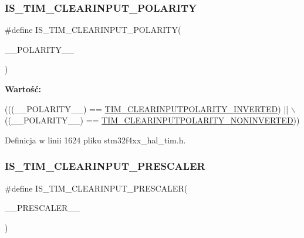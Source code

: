 \subsubsection{\texorpdfstring{I\+S\+\_\+\+T\+I\+M\+\_\+\+C\+L\+E\+A\+R\+I\+N\+P\+U\+T\+\_\+\+P\+O\+L\+A\+R\+I\+TY}{IS\_TIM\_CLEARINPUT\_POLARITY}}
{\footnotesize\ttfamily \#define I\+S\+\_\+\+T\+I\+M\+\_\+\+C\+L\+E\+A\+R\+I\+N\+P\+U\+T\+\_\+\+P\+O\+L\+A\+R\+I\+TY(\begin{DoxyParamCaption}\item[{}]{\+\_\+\+\_\+\+P\+O\+L\+A\+R\+I\+T\+Y\+\_\+\+\_\+ }\end{DoxyParamCaption})}

{\bfseries Wartość\+:}
\begin{DoxyCode}
(((\_\_POLARITY\_\_) == \hyperlink{group___t_i_m___clear_input___polarity_ga02e0d10a2cf90016d1a8be1931c6c67e}{TIM\_CLEARINPUTPOLARITY\_INVERTED}) || \(\backslash\)
                                                  ((\_\_POLARITY\_\_) == 
      \hyperlink{group___t_i_m___clear_input___polarity_ga53e02f7692e6996389b462219572f2a9}{TIM\_CLEARINPUTPOLARITY\_NONINVERTED}))
\end{DoxyCode}


Definicja w linii 1624 pliku stm32f4xx\+\_\+hal\+\_\+tim.\+h.

\mbox{\label{group___t_i_m___private___macros_ga861bb16ad77e0ede52a3d5f296583d0b}} 
\subsubsection{\texorpdfstring{I\+S\+\_\+\+T\+I\+M\+\_\+\+C\+L\+E\+A\+R\+I\+N\+P\+U\+T\+\_\+\+P\+R\+E\+S\+C\+A\+L\+ER}{IS\_TIM\_CLEARINPUT\_PRESCALER}}
{\footnotesize\ttfamily \#define I\+S\+\_\+\+T\+I\+M\+\_\+\+C\+L\+E\+A\+R\+I\+N\+P\+U\+T\+\_\+\+P\+R\+E\+S\+C\+A\+L\+ER(\begin{DoxyParamCaption}\item[{}]{\+\_\+\+\_\+\+P\+R\+E\+S\+C\+A\+L\+E\+R\+\_\+\+\_\+ }\end{DoxyParamCaption})}

